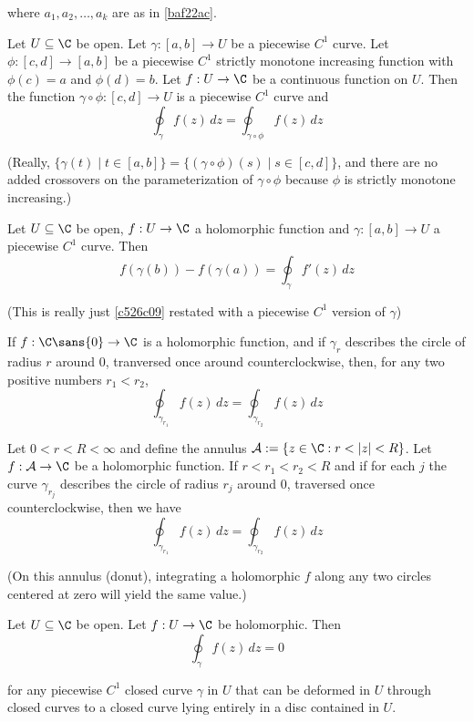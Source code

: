 where $a_1,a_2,\ldots,a_k$ are as in \autoref{baf22ac}.

\Lemma{}\label{b6b6d51}

Let $U\subseteq\C$ be open. Let $\gamma:[a,b]\to U$ be a piecewise $C^1$ curve.
Let $\phi:[c,d]\to[a,b]$ be a piecewise $C^1$ strictly monotone increasing
function with $\phi(c)=a$ and $\phi(d)=b$. Let $f:U\to\C$ be a continuous
function on $U$. Then the function $\gamma\circ\phi:[c,d]\to U$ is a piecewise
$C^1$ curve and
$$
  \oint_\gamma f(z)\,dz=\oint_{\gamma\circ\phi}f(z)\,dz
$$

(Really, $\{\gamma(t)\mid t\in[a,b]\}=\{(\gamma\circ\phi)(s)\mid s
\in[c,d]\}$, and there are no added crossovers on the parameterization
of $\gamma\circ\phi$ because $\phi$ is strictly monotone increasing.)

\Lemma{}\label{cd28a8f}

Let $U\subseteq\C$ be open, $f:U\to\C$ a holomorphic function and
$\gamma:[a,b]\to U$ a piecewise $C^1$ curve. Then
$$
  f(\gamma(b))-f(\gamma(a))=\oint_\gamma f'(z)\,dz
$$

(This is really just \autoref{c526c09} restated
with a piecewise $C^1$ version of $\gamma$)

\Proposition{}\label{b52bca5}

If $f:\C\sans{0}\to\C$ is a holomorphic function, and if $\gamma_r$ describes
the circle of radius $r$ around $0$, tranversed once around counterclockwise,
then, for any two positive numbers $r_1<r_2$,
$$
  \oint_{\gamma_{r_1}}f(z)\,dz=\oint_{\gamma_{r_2}}f(z)\,dz
$$

\Proposition{}\label{ecbc559}

Let $0<r<R<\infty$ and define the annulus $\mathcal A:=\{z\in\C:r<|z|<R\}$. Let
$f:\mathcal A\to\C$ be a holomorphic function. If $r<r_1<r_2<R$ and if for each
$j$ the curve $\gamma_{r_j}$ describes the circle of radius $r_j$ around 0,
traversed once counterclockwise, then we have
$$
  \oint_{\gamma_{r_1}}f(z)\,dz=\oint_{\gamma_{r_2}}f(z)\,dz
$$

(On this annulus (donut), integrating a holomorphic $f$ along any two
circles centered at zero will yield the same value.)

\label{be5c80c}

Let $U\subseteq\C$ be open. Let $f:U\to\C$ be holomorphic. Then
$$
  \oint_\gamma f(z)\,dz=0
$$

for any piecewise $C^1$ closed curve $\gamma$ in $U$ that can be deformed in
$U$ through closed curves to a closed curve lying entirely in a disc contained
in $U$.

